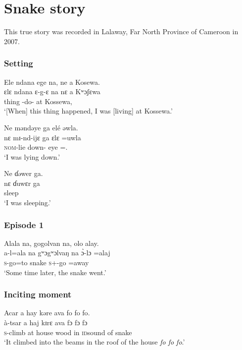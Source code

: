 \clearpage
\section[Snake story]{Snake story\\\hspace{1.5em} \textnormal{}}\label{sec:1.4}
\hypertarget{RefHeading1210321525720847}{}
This true story was recorded in Lalaway, Far North Province of Cameroon in 2007.  

\subsubsection*{Setting}
\ea
Ele  ndana  ege  na,  ne  a Kosewa.\\
\gll ɛlɛ     ndana  ɛ-g-ɛ    na    nɛ   a Kʷɔʃɛwa\\
thing {\DEM}    {\SSS-do{}-\CL}  {\PSP}     {\oneS}  at  Kossewa,\\
\glt ‘[When] this thing happened, I was [living] at Kossewa.’\\
\z

\noindent\parbox{\textwidth}{\ea
Ne məndəye  ga  elé  əwla.\\
\gll nɛ  mɪ-nd-ijɛ    ga  ɛlɛ  =uwla\\
{\oneS}  {\textsc{nom}-lie down-{\CL}}   {\ADJ}   eye   =\oneS.{\POSS}  \\
\glt ‘I was lying down.’
\z}

\ea 
Ne ɗəwer ga.\\
\gll nɛ   ɗuwɛr  ga\\
{\oneS}   sleep    {\ADJ} \\
\glt ‘I was sleeping.’
\z

\subsubsection*{Episode 1}
\ea 
 Alala  na, gogolvan  na, olo  alay.\\
\gll a-l=ala na gʷɔgʷɔlvaŋ   na \`ɔ{}-lɔ    =alaj\\
\textsc{s}-go=to       {\PSP}  snake      {\PSP}   \textsc{s}+{\PFV}-go   =away\\
\glt ‘Some time later, the snake went.’
\z

\subsubsection*{Inciting moment}
\ea
 Acar  a  hay  kəre  ava  {fo fo fo}.\\
\gll à-tsar  a  haj  kɪrɛ  ava  {fɔ fɔ fɔ}\\
\textsc{s}-climb at house   wood      in {\textsc{id}sound of snake}\\
\glt ‘It climbed into the beams in the roof of the house \textit{fo fo fo}.’
\z

